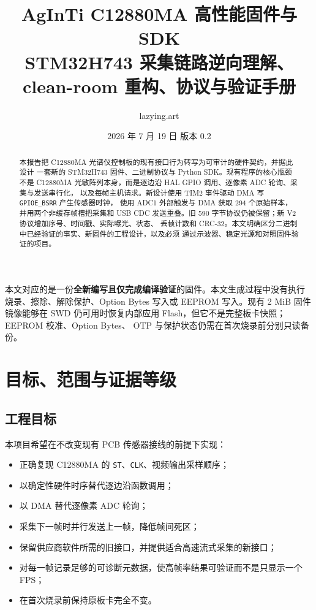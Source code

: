\documentclass[UTF8,fontset=windows,11pt]{ctexart}
\title{
  \vspace{-1.5cm}
  {\color{navy}\bfseries\LARGE AgInTi C12880MA 高性能固件与 SDK}\\[4pt]
  {\large STM32H743 采集链路逆向理解、clean-room 重构、协议与验证手册}
}
\author{lazying.art}
\date{2026 年 7 月 19 日 \quad 版本 0.2}
\newcommand{\code}[1]{\texttt{#1}}
\begin{document}
\maketitle

\begin{tcolorbox}[colback=coral!8,colframe=coral,title=安全边界,fonttitle=\bfseries]
本文对应的是一份\textbf{全新编写且仅完成编译验证}的固件。本文生成过程中没有执行
烧录、擦除、解除保护、Option Bytes 写入或 EEPROM 写入。现有 2 MiB 固件镜像能够在
SWD 仍可用时恢复内部应用 Flash，但它不是完整板卡快照；EEPROM 校准、Option Bytes、
OTP 与保护状态仍需在首次烧录前分别只读备份。
\end{tcolorbox}

\begin{abstract}
本报告把 C12880MA 光谱仪控制板的现有接口行为转写为可审计的硬件契约，并据此设计
一套新的 STM32H743 固件、二进制协议与 Python SDK。现有程序的核心瓶颈不是
C12880MA 光敏阵列本身，而是逐边沿 HAL GPIO 调用、逐像素 ADC 轮询、采集与发送串行化，
以及每帧主机请求。新设计使用 TIM2 事件驱动 DMA 写 \code{GPIOE\_BSRR} 产生传感器时钟，
使用 ADC1 外部触发与 DMA 获取 294 个原始样本，并用两个非缓存帧槽把采集和 USB CDC
发送重叠。旧 590 字节协议仍被保留；新 V2 协议增加序号、时间戳、实际曝光、状态、
丢帧计数和 CRC-32。本文明确区分二进制中已经验证的事实、新固件的工程设计，以及必须
通过示波器、稳定光源和对照固件验证的项目。
\end{abstract}

\tableofcontents
\newpage

\section{目标、范围与证据等级}

\subsection{工程目标}

本项目希望在不改变现有 PCB 传感器接线的前提下实现：
\begin{itemize}
  \item 正确复现 C12880MA 的 \code{ST}、\code{CLK}、视频输出采样顺序；
  \item 以确定性硬件时序替代逐边沿函数调用；
  \item 以 DMA 替代逐像素 ADC 轮询；
  \item 采集下一帧时并行发送上一帧，降低帧间死区；
  \item 保留供应商软件所需的旧接口，并提供适合高速流式采集的新接口；
  \item 对每一帧记录足够的可诊断元数据，使高帧率结果可验证而不是只显示一个 FPS；
  \item 在首次烧录前保持原板卡完全不变。
\end{itemize}
\end{document}

